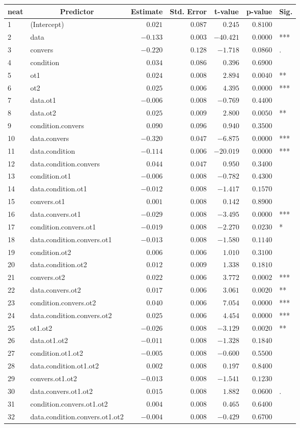 \begin{table}[!tbp]
\begin{center}
\begin{tabular}{llrrrrl}
\hline\hline
\multicolumn{1}{l}{neat}&\multicolumn{1}{c}{Predictor}&\multicolumn{1}{c}{Estimate}&\multicolumn{1}{c}{Std. Error}&\multicolumn{1}{c}{t-value}&\multicolumn{1}{c}{p-value}&\multicolumn{1}{c}{Sig.}\tabularnewline
\hline
1&(Intercept)&$ 0.021$&$0.087$&$  0.245$&$0.8100$& \tabularnewline
2&data&$-0.133$&$0.003$&$-40.421$&$0.0000$&***\tabularnewline
3&convers&$-0.220$&$0.128$&$ -1.718$&$0.0860$&.\tabularnewline
4&condition&$ 0.034$&$0.086$&$  0.396$&$0.6900$& \tabularnewline
5&ot1&$ 0.024$&$0.008$&$  2.894$&$0.0040$&**\tabularnewline
6&ot2&$ 0.025$&$0.006$&$  4.395$&$0.0000$&***\tabularnewline
7&data.ot1&$-0.006$&$0.008$&$ -0.769$&$0.4400$& \tabularnewline
8&data.ot2&$ 0.025$&$0.009$&$  2.800$&$0.0050$&**\tabularnewline
9&condition.convers&$ 0.090$&$0.096$&$  0.940$&$0.3500$& \tabularnewline
10&data.convers&$-0.320$&$0.047$&$ -6.875$&$0.0000$&***\tabularnewline
11&data.condition&$-0.114$&$0.006$&$-20.019$&$0.0000$&***\tabularnewline
12&data.condition.convers&$ 0.044$&$0.047$&$  0.950$&$0.3400$& \tabularnewline
13&condition.ot1&$-0.006$&$0.008$&$ -0.782$&$0.4300$& \tabularnewline
14&data.condition.ot1&$-0.012$&$0.008$&$ -1.417$&$0.1570$& \tabularnewline
15&convers.ot1&$ 0.001$&$0.008$&$  0.142$&$0.8900$& \tabularnewline
16&data.convers.ot1&$-0.029$&$0.008$&$ -3.495$&$0.0000$&***\tabularnewline
17&condition.convers.ot1&$-0.019$&$0.008$&$ -2.270$&$0.0230$&*\tabularnewline
18&data.condition.convers.ot1&$-0.013$&$0.008$&$ -1.580$&$0.1140$& \tabularnewline
19&condition.ot2&$ 0.006$&$0.006$&$  1.010$&$0.3100$& \tabularnewline
20&data.condition.ot2&$ 0.012$&$0.009$&$  1.338$&$0.1810$& \tabularnewline
21&convers.ot2&$ 0.022$&$0.006$&$  3.772$&$0.0002$&***\tabularnewline
22&data.convers.ot2&$ 0.017$&$0.006$&$  3.061$&$0.0020$&**\tabularnewline
23&condition.convers.ot2&$ 0.040$&$0.006$&$  7.054$&$0.0000$&***\tabularnewline
24&data.condition.convers.ot2&$ 0.025$&$0.006$&$  4.454$&$0.0000$&***\tabularnewline
25&ot1.ot2&$-0.026$&$0.008$&$ -3.129$&$0.0020$&**\tabularnewline
26&data.ot1.ot2&$-0.011$&$0.008$&$ -1.328$&$0.1840$& \tabularnewline
27&condition.ot1.ot2&$-0.005$&$0.008$&$ -0.600$&$0.5500$& \tabularnewline
28&data.condition.ot1.ot2&$ 0.002$&$0.008$&$  0.197$&$0.8400$& \tabularnewline
29&convers.ot1.ot2&$-0.013$&$0.008$&$ -1.541$&$0.1230$& \tabularnewline
30&data.convers.ot1.ot2&$ 0.015$&$0.008$&$  1.882$&$0.0600$&.\tabularnewline
31&condition.convers.ot1.ot2&$ 0.004$&$0.008$&$  0.465$&$0.6400$& \tabularnewline
32&data.condition.convers.ot1.ot2&$-0.004$&$0.008$&$ -0.429$&$0.6700$& \tabularnewline
\hline
\end{tabular}\end{center}
\end{table}
